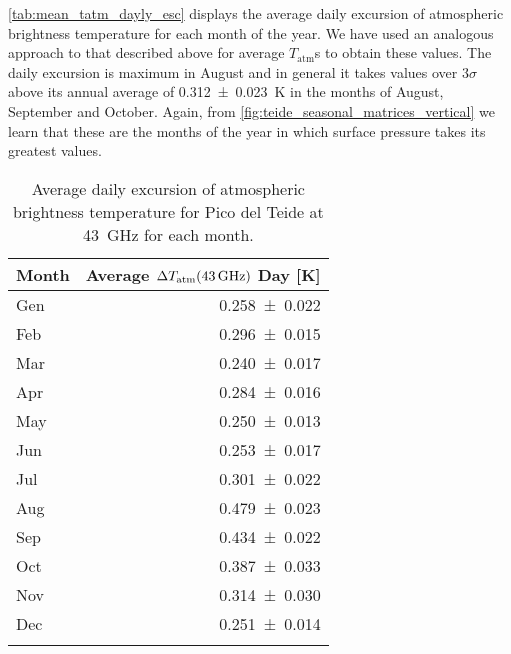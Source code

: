 \autoref{tab:mean_tatm_dayly_esc} displays the average daily excursion of
atmospheric brightness temperature for each month of the year. We have used
an analogous approach to that described above for average $T_\text{atm}$s to
obtain these values. The daily excursion is maximum in August and in
general it takes values over $3\sigma$ above its annual average of
\SI{0.312 \pm 0.023}{\kelvin} in the months of August, September and
October. Again, from \autoref{fig:teide_seasonal_matrices_vertical} we
learn that these are the months of the year in which surface pressure
takes its greatest values.

\begin{table}
        \renewcommand{\arraystretch}{1.5}
        \centering
        \begin{tabular}{p{5cm} r}
                \hline
                Month & Average $\Delta
                T_\text{atm}\qty(\SI{43}{\giga\hertz})$
                Day [\si{\kelvin}] \\
                \hline
                \hline
                Gen \dotfill & \num{0.258 \pm 0.022} \\
                Feb \dotfill & \num{0.296 \pm 0.015} \\
                Mar \dotfill & \num{0.240 \pm 0.017} \\
                Apr \dotfill & \num{0.284 \pm 0.016} \\
                May \dotfill & \num{0.250 \pm 0.013} \\
                Jun \dotfill & \num{0.253 \pm 0.017} \\
                Jul \dotfill & \num{0.301 \pm 0.022} \\
                Aug \dotfill & \num{0.479 \pm 0.023} \\
                Sep \dotfill & \num{0.434 \pm 0.022} \\
                Oct \dotfill & \num{0.387 \pm 0.033} \\
                Nov \dotfill & \num{0.314 \pm 0.030} \\
                Dec \dotfill & \num{0.251 \pm 0.014} \\
                \noalign{\smallskip}
                \hline
        \end{tabular}
        \caption{Average daily excursion of atmospheric brightness
        temperature for Pico del Teide at \SI{43}{\giga\hertz} for each
        month.}
        \label{tab:mean_tatm_dayly_esc}
\end{table}

